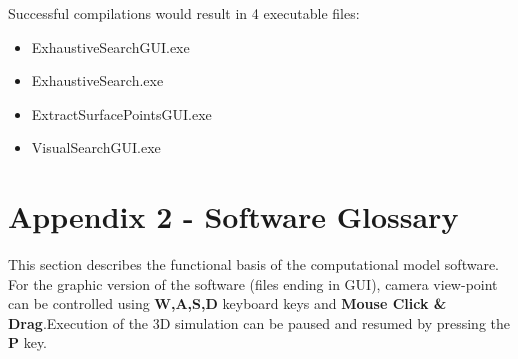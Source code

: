 \documentclass[11]{article}
\begin{document}
Successful compilations would result in 4 executable files: 
\begin{itemize}
  \item ExhaustiveSearchGUI.exe 
  \item ExhaustiveSearch.exe
  \item ExtractSurfacePointsGUI.exe  
  \item VisualSearchGUI.exe
\end{itemize}

\section{Appendix 2 - Software Glossary}
This section describes the functional basis of the computational model software. 
For the graphic version of the software (files ending in GUI), camera view-point can be controlled using \textbf{W,A,S,D} keyboard keys and \textbf{Mouse Click \& Drag}.Execution of the 3D simulation can be paused and resumed by pressing the \textbf{P} key.
\end{document}
